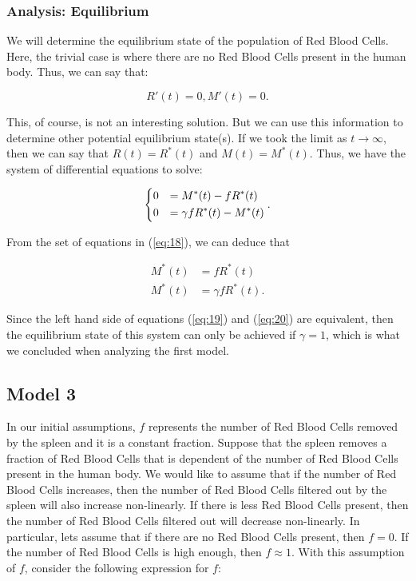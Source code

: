 \subsubsection{Analysis: Equilibrium}

We will determine the equilibrium state of the population of Red Blood Cells. Here, the trivial case is where there are no Red Blood Cells present in the human body. Thus, we can say that:

\[
R'(t) = 0, M'(t) = 0.
\]

This, of course, is not an interesting solution. But we can use this information to determine other potential equilibrium state(s). If we took the limit as $t\to\infty$, then we can say that $R(t) = R^\ast(t)$ and $M(t) = M^\ast(t)$. Thus, we have the system of differential equations to solve:

\begin{equation}
    \begin{dcases}
        0 &= M^\ast(t)-fR^\ast(t)\\
        0 &= \gamma fR^\ast(t) - M^\ast(t)
    \end{dcases}.
    \label{eq:18}
\end{equation}

From the set of equations in (\ref{eq:18}), we can deduce that

\begin{align}
    M^\ast(t) &= fR^\ast(t) \label{eq:19}\\
    M^\ast(t) &= \gamma fR^\ast(t). \label{eq:20}
\end{align}

Since the left hand side of equations (\ref{eq:19}) and (\ref{eq:20}) are equivalent, then the equilibrium state of this system can only be achieved if $\gamma = 1$, which is what we concluded when analyzing the first model.

\subsection{Model 3}

In our initial assumptions, $f$ represents the number of Red Blood Cells removed by the spleen and it is a constant fraction. Suppose that the spleen removes a fraction of Red Blood Cells that is dependent of the number of Red Blood Cells present in the human body. We would like to assume that if the number of Red Blood Cells increases, then the number of Red Blood Cells filtered out by the spleen will also increase non-linearly. If there is less Red Blood Cells present, then the number of Red Blood Cells filtered out will decrease non-linearly. In particular, lets assume that if there are no Red Blood Cells present, then $f=0$. If the number of Red Blood Cells is high enough, then $f \approx 1$. With this assumption of $f$, consider the following expression for $f$:

